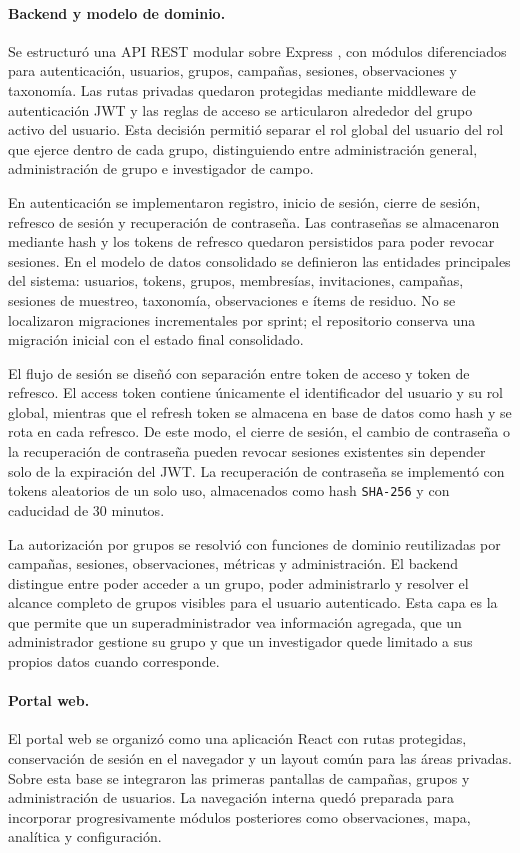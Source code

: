 \paragraph{Backend y modelo de dominio.}
Se estructuró una API REST modular sobre Express \cite{express}, con módulos diferenciados
para autenticación, usuarios, grupos, campañas, sesiones, observaciones y
taxonomía. Las rutas privadas quedaron protegidas mediante middleware de
autenticación JWT \cite{rfc7519jwt} y las reglas de acceso se articularon alrededor del grupo
activo del usuario. Esta decisión permitió separar el rol global del usuario
del rol que ejerce dentro de cada grupo, distinguiendo entre administración
general, administración de grupo e investigador de campo.

En autenticación se implementaron registro, inicio de sesión, cierre de sesión,
refresco de sesión y recuperación de contraseña. Las contraseñas se almacenaron
mediante hash y los tokens de refresco quedaron persistidos para poder revocar
sesiones. En el modelo de datos consolidado se definieron las entidades
principales del sistema: usuarios, tokens, grupos, membresías, invitaciones,
campañas, sesiones de muestreo, taxonomía, observaciones e ítems de residuo.
No se localizaron migraciones incrementales por sprint; el repositorio conserva
una migración inicial con el estado final consolidado.

El flujo de sesión se diseñó con separación entre token de acceso y token de
refresco. El access token contiene únicamente el identificador del usuario y su
rol global, mientras que el refresh token se almacena en base de datos como hash
y se rota en cada refresco. De este modo, el cierre de sesión, el cambio de
contraseña o la recuperación de contraseña pueden revocar sesiones existentes
sin depender solo de la expiración del JWT. La recuperación de contraseña se
implementó con tokens aleatorios de un solo uso, almacenados como hash
\texttt{SHA-256} y con caducidad de 30 minutos.

La autorización por grupos se resolvió con funciones de dominio reutilizadas por
campañas, sesiones, observaciones, métricas y administración. El backend
distingue entre poder acceder a un grupo, poder administrarlo y resolver el
alcance completo de grupos visibles para el usuario autenticado. Esta capa es
la que permite que un superadministrador vea información agregada, que un
administrador gestione su grupo y que un investigador quede limitado a sus
propios datos cuando corresponde.

\paragraph{Portal web.}
El portal web se organizó como una aplicación React \cite{react} con rutas protegidas,
conservación de sesión en el navegador y un layout común para las áreas
privadas. Sobre esta base se integraron las primeras pantallas de campañas,
grupos y administración de usuarios. La navegación interna quedó preparada para
incorporar progresivamente módulos posteriores como observaciones, mapa,
analítica y configuración.


